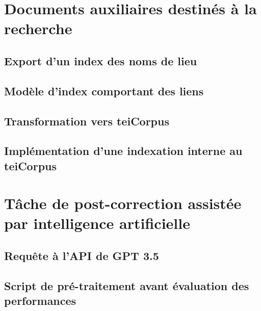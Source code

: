 \documentclass[a4paper,12pt,twoside]{book}
\begin{document}
    \chapter[Documents auxiliaires destinés à la recherche]{\label{label}Documents auxiliaires destinés à la recherche}
        \newline
        \section{Export d'un index des noms de lieu}
	    
	    \clearpage
        \newline
        \section{Modèle d'index comportant des liens}
        
        \clearpage
        \newline
        \section{Transformation vers teiCorpus}
        
        \clearpage
        \newline
        \section{Implémentation d'une indexation interne au teiCorpus}
        

    \chapter[Tâche de post-correction assistée par intelligence artificielle]{\label{label}Tâche de post-correction assistée par intelligence artificielle}
        \newline
        \section{Requête à l'API de GPT 3.5}
	    
	    \clearpage
        \newline
        \section{Script de pré-traitement avant évaluation des performances}
        
        \clearpage
        \newline
\end{document}
